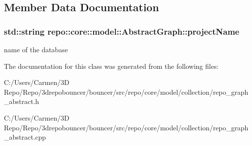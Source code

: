\subsection{Member Data Documentation}
\hypertarget{classrepo_1_1core_1_1model_1_1_abstract_graph_a8d6f646d8c8d0e5c14b31bbff17a1f1d}{}
\subsubsection[{project\+Name}]{\setlength{\rightskip}{0pt plus 5cm}std\+::string repo\+::core\+::model\+::\+Abstract\+Graph\+::project\+Name\hspace{0.3cm}{\ttfamily [protected]}}\label{classrepo_1_1core_1_1model_1_1_abstract_graph_a8d6f646d8c8d0e5c14b31bbff17a1f1d}
name of the database 

The documentation for this class was generated from the following files\+:\begin{DoxyCompactItemize}
\item 
C\+:/\+Users/\+Carmen/3\+D Repo/\+Repo/3drepobouncer/bouncer/src/repo/core/model/collection/repo\+\_\+graph\+\_\+abstract.\+h\item 
C\+:/\+Users/\+Carmen/3\+D Repo/\+Repo/3drepobouncer/bouncer/src/repo/core/model/collection/repo\+\_\+graph\+\_\+abstract.\+cpp\end{DoxyCompactItemize}
